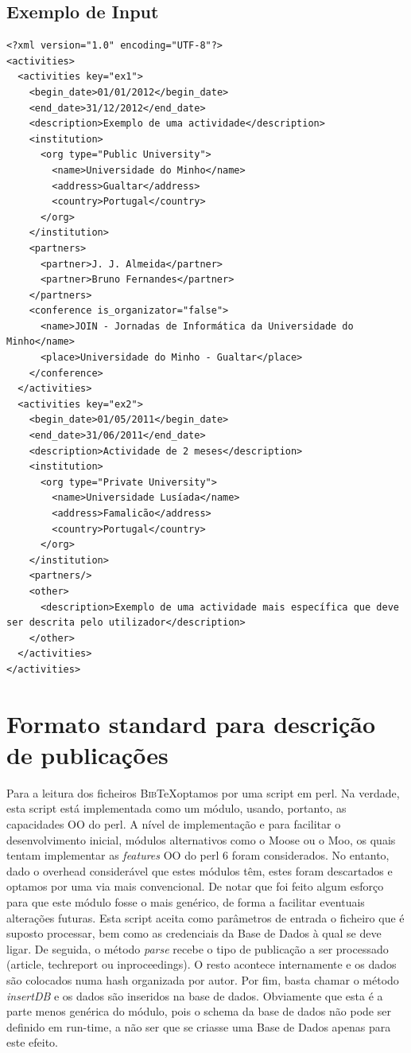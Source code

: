 \documentclass[a4paper,11pt,openright,openbib]{article}
\begin{document}
\subsection{Exemplo de Input}
\begin{verbatim}
<?xml version="1.0" encoding="UTF-8"?>
<activities>
  <activities key="ex1">
    <begin_date>01/01/2012</begin_date>
    <end_date>31/12/2012</end_date>
    <description>Exemplo de uma actividade</description>
    <institution>
      <org type="Public University">
        <name>Universidade do Minho</name>
        <address>Gualtar</address>
        <country>Portugal</country>
      </org>
    </institution>
    <partners>
      <partner>J. J. Almeida</partner>
      <partner>Bruno Fernandes</partner>
    </partners>
    <conference is_organizator="false">
      <name>JOIN - Jornadas de Informática da Universidade do Minho</name>
      <place>Universidade do Minho - Gualtar</place>
    </conference>
  </activities>
  <activities key="ex2">
    <begin_date>01/05/2011</begin_date>
    <end_date>31/06/2011</end_date>
    <description>Actividade de 2 meses</description>
    <institution>
      <org type="Private University">
        <name>Universidade Lusíada</name>
        <address>Famalicão</address>
        <country>Portugal</country>
      </org>
    </institution>
    <partners/>
    <other>
      <description>Exemplo de uma actividade mais específica que deve ser descrita pelo utilizador</description>
    </other>
  </activities>
</activities>
\end{verbatim}

\section{Formato standard para descrição de publicações}
Para a leitura dos ficheiros \textsc{Bib}\negthinspace\TeX optamos por uma script em perl. Na verdade, esta script está implementada como um módulo, usando, portanto, as capacidades OO do perl. A nível de implementação e para facilitar o desenvolvimento inicial, módulos alternativos como o Moose ou o Moo, os quais tentam implementar as \textit{features} OO do perl 6 foram considerados. No entanto, dado o overhead considerável que estes módulos têm, estes foram descartados e optamos por uma via mais convencional. De notar que foi feito algum esforço para que este módulo fosse o mais genérico, de forma a facilitar eventuais alterações futuras.  Esta script aceita como parâmetros de entrada o ficheiro que é suposto processar, bem como as credenciais da Base de Dados à qual se deve ligar. De seguida, o método \textit{parse} recebe o tipo de publicação a ser processado (article, techreport ou inproceedings). O resto acontece internamente e os dados são colocados numa hash organizada por autor. Por fim, basta chamar o método \textit{insertDB} e os dados são inseridos na base de dados. Obviamente que esta é a parte menos genérica do módulo, pois o schema da base de dados não pode ser definido em run-time, a não ser que se criasse uma Base de Dados apenas para este efeito. 
\end{document}
